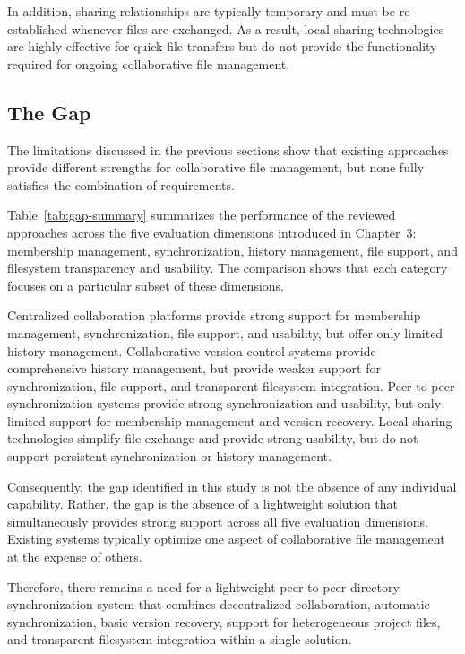 In addition, sharing relationships are typically temporary and
must be re-established whenever files are exchanged. As a
result, local sharing technologies are highly effective for
quick file transfers but do not provide the functionality
required for ongoing collaborative file management.

\subsection{The Gap}

The limitations discussed in the previous sections
show that existing approaches provide different strengths for
collaborative file management, but none fully satisfies the
combination of requirements. 

Table~\ref{tab:gap-summary} summarizes the performance of the
reviewed approaches across the five evaluation dimensions
introduced in Chapter~3: membership management,
synchronization, history management, file support, and
filesystem transparency and usability. The comparison shows
that each category focuses on a particular subset of these
dimensions.

Centralized collaboration platforms provide strong support for
membership management, synchronization, file support, and
usability, but offer only limited history management.
Collaborative version control systems provide comprehensive
history management, but provide weaker support for
synchronization, file support, and transparent filesystem
integration. Peer-to-peer synchronization systems provide
strong synchronization and usability, but only limited support
for membership management and version recovery. Local sharing
technologies simplify file exchange and provide strong
usability, but do not support persistent synchronization or
history management.

Consequently, the gap identified in this study is not the
absence of any individual capability. Rather, the gap is the
absence of a lightweight solution that simultaneously provides
strong support across all five evaluation dimensions.
Existing systems typically optimize one aspect of
collaborative file management at the expense of others.

Therefore, there remains a need for a lightweight peer-to-peer
directory synchronization system that combines decentralized
collaboration, automatic synchronization, basic version
recovery, support for heterogeneous project files, and
transparent filesystem integration within a single solution.

